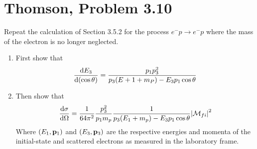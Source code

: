 \documentclass[12pt]{article}
\newcommand{\M}{\mathcal{M}}
\begin{document}
\section{Thomson, Problem 3.10}
\begin{problem}
  Repeat the calculation of Section 3.5.2 for the process $e^-p\to e^-p$ where the mass of the electron is no longer neglected.
  \begin{enumerate}[label=\alph*)]
  \item First show that
    \begin{equation*}
      \dv{E_3}{(\cos\theta)}=\frac{p_1p_3^2}{p_3(E+1+m_P)-E_3p_1\cos\theta}
    \end{equation*}
  \item Then show that
    \begin{equation*}
      \dv{\sigma}{\Omega}=\frac1{64\pi^2}\frac{p_3^2}{p_1m_p}
      \frac1{p_3(E_1+m_p)-E_3p_1\cos\theta}\abs{\M_{fi}}^2
    \end{equation*}
    Where $(E_1,\vb{p}_1)$ and $(E_3,\vb{p}_3)$ are the respective energies and momenta of the initial-state and scattered electrons as measured in the laboratory frame.
  \end{enumerate}
\end{problem}
\end{document}
